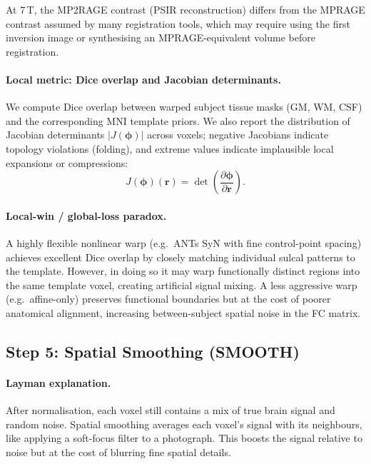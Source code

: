 \documentclass[11pt,a4paper]{article}
\begin{document}
At 7\,T, the MP2RAGE contrast (PSIR reconstruction) differs from the MPRAGE contrast assumed by many registration tools, which may require using the first inversion image or synthesising an MPRAGE-equivalent volume before registration.

\paragraph{Local metric: Dice overlap and Jacobian determinants.}
We compute Dice overlap between warped subject tissue masks (GM, WM, CSF) and the corresponding MNI template priors.  We also report the distribution of Jacobian determinants $|J(\boldsymbol\phi)|$ across voxels; negative Jacobians indicate topology violations (folding), and extreme values indicate implausible local expansions or compressions:
\begin{equation}
    J(\boldsymbol\phi)(\mathbf{r}) = \det\!\left(\frac{\partial \boldsymbol\phi}{\partial \mathbf{r}}\right).
\end{equation}

\paragraph{Local-win / global-loss paradox.}
A highly flexible nonlinear warp (e.g.\ ANTs SyN with fine control-point spacing) achieves excellent Dice overlap by closely matching individual sulcal patterns to the template.  However, in doing so it may warp functionally distinct regions into the same template voxel, creating artificial signal mixing.  A less aggressive warp (e.g.\ affine-only) preserves functional boundaries but at the cost of poorer anatomical alignment, increasing between-subject spatial noise in the FC matrix.

\subsection{Step 5: Spatial Smoothing (SMOOTH)}
\label{app:smooth}

\paragraph{Layman explanation.}
After normalisation, each voxel still contains a mix of true brain signal and random noise.  Spatial smoothing averages each voxel's signal with its neighbours, like applying a soft-focus filter to a photograph.  This boosts the signal relative to noise but at the cost of blurring fine spatial details.
\end{document}
